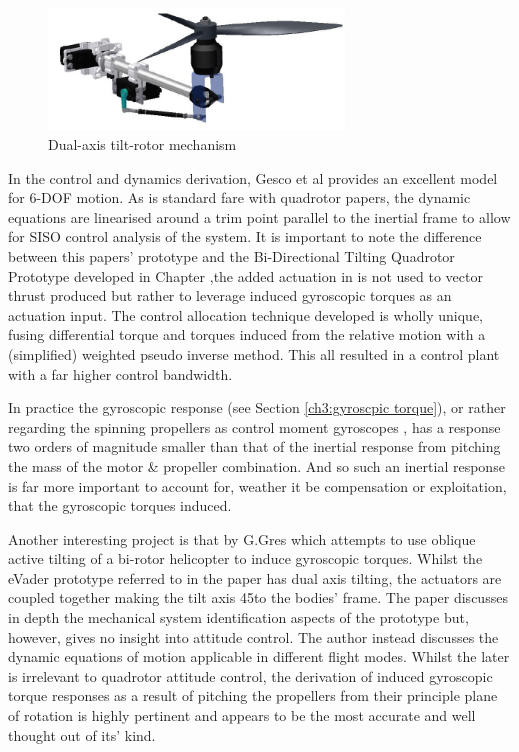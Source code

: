 \begin{figure}[hbtp]
\centering
\includegraphics[width=0.7\textwidth]{figs/gasco-mech}
\caption{Dual-axis tilt-rotor mechanism}
\label{fig:tiltrotor-gasco}
\end{figure}
\par
In the control and dynamics derivation, Gesco et al provides an excellent model for 6-DOF motion. As is standard fare with quadrotor papers, the dynamic equations are linearised around a trim point parallel to the inertial frame to allow for SISO control analysis of the system. It is important to note the difference between this papers' prototype and the Bi-Directional Tilting Quadrotor Prototype developed in Chapter \cite{ch:design} ,the added actuation in \cite{tiltgasco} is not used to vector thrust produced but rather to leverage induced gyroscopic torques as an actuation input. The control allocation technique developed is wholly unique, fusing differential torque and torques induced from the relative motion with a (simplified) weighted pseudo inverse method. This all resulted in a control plant with a far higher control bandwidth. 
\par
In practice the gyroscopic response (see Section \ref{ch3:gyroscpic torque}), or rather regarding the spinning propellers as control moment gyroscopes \cite{cmg}, has a response two orders of magnitude smaller than that of the inertial response from pitching the mass of the motor \& propeller combination. And so such an inertial response is far more important to account for, weather it be compensation or exploitation, that the gyroscopic torques induced.
\par



Another interesting project is that by G.Gres \cite{gres2007} which attempts to use oblique active tilting of a bi-rotor helicopter to induce gyroscopic torques. Whilst the eVader prototype referred to in the paper has dual axis tilting, the actuators are coupled together making the tilt axis 45\textdegree to the bodies' frame. The paper discusses in depth the mechanical system identification aspects of the prototype but, however, gives no insight into attitude control. The author instead discusses the dynamic equations of motion applicable in different flight modes. Whilst the later is irrelevant to quadrotor attitude control, the derivation of induced gyroscopic torque responses as a result of pitching the propellers from their principle plane of rotation is highly pertinent and appears to be the most accurate and well thought out of its' kind.

